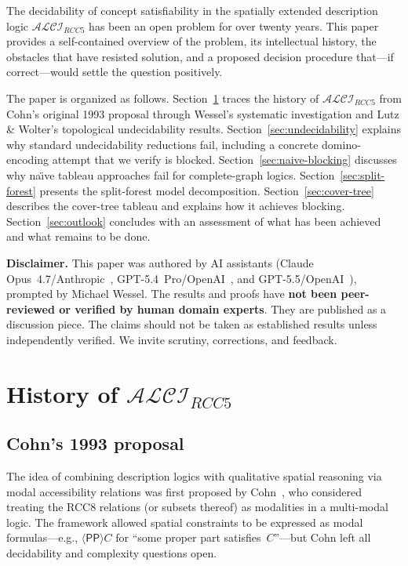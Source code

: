 \documentclass[
]{ceurart}
\theoremstyle{definition}
\newcommand{\ALCIRCC}[1]{\ensuremath{\mathcal{ALCI}_{\mathit{RCC#1}}}}
\newcommand{\PP}{\ensuremath{\mathsf{PP}}}
\begin{document}
The decidability of concept satisfiability in the spatially extended
description logic $\ALCIRCC{5}$ has been an open problem for over
twenty years.  This paper provides a self-contained overview of the
problem, its intellectual history, the obstacles that have resisted
solution, and a proposed decision procedure that---if correct---would
settle the question positively.

The paper is organized as follows.
Section~\ref{sec:history} traces the history of $\ALCIRCC{5}$
from Cohn's original 1993 proposal through Wessel's systematic
investigation and Lutz \& Wolter's topological undecidability results.
Section~\ref{sec:undecidability} explains why standard undecidability
reductions fail, including a concrete domino-encoding attempt that
we verify is blocked.
Section~\ref{sec:naive-blocking} discusses why na\"{\i}ve tableau
approaches fail for complete-graph logics.
Section~\ref{sec:split-forest} presents the split-forest model
decomposition.
Section~\ref{sec:cover-tree} describes the cover-tree tableau and
explains how it achieves blocking.
Section~\ref{sec:outlook} concludes with an assessment of what
has been achieved and what remains to be done.

\textbf{Disclaimer.}
This paper was authored by AI assistants
(Claude Opus~4.7/Anthropic~\cite{ClaudeOpus47},
GPT-5.4~Pro/OpenAI~\cite{GPT54Pro}, and
GPT-5.5/OpenAI~\cite{GPT55Repaired}), prompted by Michael Wessel.
The results and proofs have \textbf{not been peer-reviewed or verified by
human domain experts}.  They are published as a discussion piece.
The claims should not be taken as established results unless independently
verified.  We invite scrutiny, corrections, and feedback.

\section{History of $\ALCIRCC{5}$}
\label{sec:history}

\subsection{Cohn's 1993 proposal}

The idea of combining description logics with qualitative spatial
reasoning via modal accessibility relations was first proposed by
Cohn~\cite{Cohn1993}, who considered treating the RCC8 relations
(or subsets thereof) as modalities in a multi-modal logic.
The framework allowed spatial constraints to be expressed as
modal formulas---e.g., $\langle \PP \rangle C$ for ``some proper
part satisfies~$C$''---but Cohn left all decidability and complexity
questions open.
\end{document}
